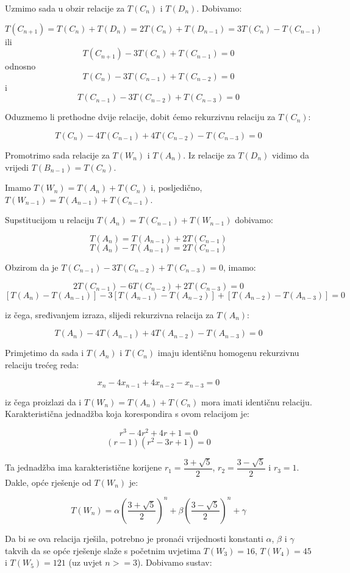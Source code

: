 \documentclass[times, utf8, zavrsni]{fer}
\begin{document}
Uzmimo sada u obzir relacije za $T(C_n)$ i $T(D_n)$. Dobivamo:

\[T(C_{n + 1}) = T(C_n) + T(D_n) = 2T(C_n) + T(D_{n - 1}) = 3T(C_n) - T(C_{n - 1})\]
ili 
\[T(C_{n + 1}) - 3T(C_n) + T(C_{n - 1}) = 0\]
odnosno
\[T(C_n) - 3T(C_{n - 1}) + T(C_{n - 2}) = 0\] i
\[T(C_{n-1}) - 3T(C_{n - 2}) + T(C_{n - 3}) = 0\]

Oduzmemo li prethodne dvije relacije, dobit ćemo rekurzivnu relaciju za $T(C_n)$:

\[T(C_n) - 4T(C_{n - 1}) + 4T(C_{n - 2}) - T(C_{n - 3}) = 0\]

Promotrimo sada relacije za $T(W_n)$ i $T(A_n)$. Iz relacije za $T(D_n)$ vidimo da vrijedi $T(B_{n -1}) = T(C_n)$. 

Imamo $T(W_n) = T(A_n) + T(C_n)$ i, posljedično, $T(W_{n - 1}) = T(A_{n - 1}) + T(C_{n - 1})$.

Supstitucijom u relaciju $T(A_n) = T(C_{n - 1}) + T(W_{n - 1})$ dobivamo:

\[T(A_n) = T(A_{n - 1}) + 2T(C_{n - 1})\]
\[T(A_n) - T(A_{n - 1}) = 2T(C_{n - 1})\]

Obzirom da je $T(C_{n - 1}) - 3T(C_{n - 2}) + T(C_{n - 3}) = 0$, imamo:

\[2T(C_{n - 1}) - 6T(C_{n - 2}) + 2T(C_{n - 3}) = 0\]
\[[T(A_n) - T(A_{n - 1})] - 3[T(A_{n - 1}) - T(A_{n - 2})] + [T(A_{n - 2}) - T(A_{n - 3})] = 0\]

iz čega, sređivanjem izraza, slijedi rekurzivna relacija za $T(A_n)$:

\[T(A_n) - 4T(A_{n - 1}) + 4T(A_{n - 2}) - T(A_{n - 3}) = 0\]

Primjetimo da sada i $T(A_n)$ i $T(C_n)$ imaju identičnu homogenu rekurzivnu relaciju trećeg reda:

\[x_n - 4x_{n - 1} + 4x_{n - 2} - x_{n - 3} = 0\]

iz čega proizlazi da i $T(W_n) = T(A_n) + T(C_n)$ mora imati identičnu relaciju. Karakteristična jednadžba koja korespondira s ovom relacijom je:

\[r^3 - 4r^2 + 4r + 1 = 0\]
\[(r - 1)(r^2 - 3r + 1) = 0\]

Ta jednadžba ima karakteristične korijene $r_1 = \dfrac{3 + \sqrt{5}}{2}$, $r_2 = \dfrac{3 - \sqrt{5}}{2}$ i $r_3 = 1$. Dakle, opće rješenje od $T(W_n)$ je:

\[T(W_n) = \alpha(\dfrac{3 + \sqrt{5}}{2})^n + \beta(\dfrac{3 - \sqrt{5}}{2})^n + \gamma\]

Da bi se ova relacija rješila, potrebno je pronaći vrijednosti konstanti $\alpha$, $\beta$ i $\gamma$ takvih da se opće rješenje slaže s početnim uvjetima $T(W_3) = 16$, $T(W_4) = 45$ i $T(W_5) = 121$ (uz uvjet $n >= 3$). Dobivamo sustav:
\end{document}
